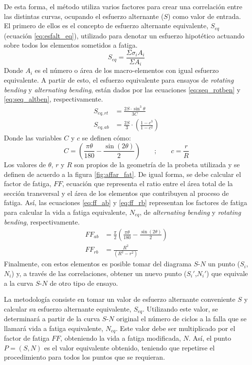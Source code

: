 De esta forma, el método utiliza varios factores para crear una correlación entre las distintas curvas, ocupando el esfuerzo alternante ($S$) como valor de entrada. El primero de ellos es el concepto de esfuerzo alternante equivalente, $S_{eq}$ (ecuación \ref{eq:esfalt_eq}), utilizado para denotar un esfuerzo hipotético actuando sobre todos los elementos sometidos a fatiga. 
\begin{equation}\label{eq:esfalt_eq}
	S_{eq} = \frac{\Sigma \sigma_i A_i}{\Sigma A_i}
\end{equation}
Donde $A_i$ es el número o área de los macro-elementos con igual esfuerzo equivalente. A partir de esto, el esfuerzo equivalente para ensayos de \textit{rotating bending} y \textit{alternating bending}, están dados por las ecuaciones \ref{eq:seq_rotben} y \ref{eq:seq_altben}, respectivamente. 
\begin{align}
	S_{eq,rt} &= \frac{2S\cdot \sin^3 \theta}{3C} \label{eq:seq_rotben}\\
	S_{eq,ab} &= \frac{2S}{3} \cdot \left(\frac{1-c^3}{1-c^2}\right) \label{eq:seq_altben}
\end{align}
Donde las variables $C$ y $c$ se definen cómo:
\begin{equation}
	C= \left(\frac{\pi\theta}{180} - \frac{\sin(2\theta)}{2}\right)\qquad ;\qquad c=\frac{r}{R}
\end{equation}
Los valores de $\theta$, $r$ y $R$ son propios de la geometría de la probeta utilizada y se definen de acuerdo a la figura \ref{fig:affar_fat}. De igual forma, se debe calcular el factor de fatiga, $FF$, ecuación que representa el ratio entre el área total de la sección transversal y el área de los elementos que contribuyen al proceso de fatiga. Así, las ecuaciones \ref{eq:ff_ab} y \ref{eq:ff_rb} representan los factores de fatiga para calcular la vida a fatiga equivalente, $N_{eq}$, de \textit{alternating bending} y \textit{rotating bending}, respectivamente.
\begin{align}
	FF_{ab} &= \frac{\pi}{2} \left(\frac{\pi\theta}{180} - \frac{\sin(2\theta)}{2}\right) \label{eq:ff_ab}\\		
	FF_{rb} &= \frac{R^2}{(R^2 - r^2)} \label{eq:ff_rb}
\end{align}
Finalmente, con estos elementos es posible tomar del diagrama $S$-$N$ un punto ($S_i$,$N_i$) y, a través de las correlaciones, obtener un nuevo punto ($S_i'$,$N_i'$) que equivale a la curva $S$-$N$ de otro tipo de ensayo.

La metodología consiste en tomar un valor de esfuerzo alternante conveniente $S$ y calcular su esfuerzo alternante equivalente, $S_{eq}$. Utilizando este valor, se determinará a partir de la curva $S$-$N$ original el número de ciclos a la falla que se llamará vida a fatiga equivalente, $N_{eq}$. Este valor debe ser multiplicado por el factor de fatiga $FF$, obteniendo la vida a fatiga modificada, $N$. Así, el punto $P=(S,N)$ es el valor equivalente obtenido, teniendo que repetirse el procedimiento para todos los puntos que se requieran.

